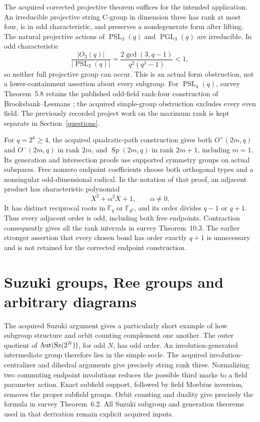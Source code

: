 \documentclass[11pt]{article}
\newcommand{\PSL}{\operatorname{PSL}}\newcommand{\PGL}{\operatorname{PGL}}
\newcommand{\Sp}{\operatorname{Sp}}\newcommand{\Aut}{\operatorname{Aut}}
\begin{document}
The acquired corrected projective theorem suffices for the intended
application. An irreducible projective string C-group in dimension
three has rank at most four, is in odd characteristic, and preserves
a nondegenerate form after lifting. The natural projective actions
of $\PSL_3(q)$ and $\PGL_3(q)$ are irreducible. In odd characteristic
\[
       \frac{|O_3(q)|}{|\PSL_3(q)|}
       =\frac{2\gcd(3,q-1)}{q^2(q^3-1)}<1,
\]
so neither full projective group can occur. This is an actual form
obstruction, not a lower-containment assertion about every subgroup.
For $\PSL_4(q)$, survey Theorem~5.8 retains the published odd-field
rank-four construction of Brooksbank--Leemans \cite{linear4}; the
acquired simple-group obstruction excludes every even field.
The previously recorded project work on the maximum rank is kept
separate in Section~\ref{questions}.

For $q=2^k\ge4$, the acquired quadratic-path construction gives both
$O^+(2m,q)$ and $O^-(2m,q)$ in rank $2m$, and $\Sp(2m,q)$ in
rank $2m+1$, including $m=1$. Its generation and intersection proofs
use supported symmetry groups on actual subspaces. Free nonzero
endpoint coefficients choose both orthogonal types and a nonsingular
odd-dimensional radical. In the notation of that proof, an adjacent
product has characteristic polynomial
\[
                         X^2+\alpha^2X+1,\qquad\alpha\ne0.
\]
It has distinct reciprocal roots in $\mathbb F_q$ or
$\mathbb F_{q^2}$, and its order divides $q-1$ or $q+1$.
Thus every adjacent order is odd, including both free endpoints.
Contraction consequently gives all the rank intervals in survey
Theorem~10.3. The earlier stronger assertion that every chosen bond
has order exactly $q+1$ is unnecessary and is not retained for the
corrected endpoint construction.

\section{Suzuki groups, Ree groups and arbitrary diagrams}
The acquired Suzuki argument gives a particularly short example of
how subgroup structure and orbit counting complement one another.
The outer quotient of $\Aut(\Sz(2^N))$, for odd $N$, has odd order.
An involution-generated intermediate group therefore lies in the
simple socle. The acquired involution-centralizer and dihedral
arguments give precisely string rank three. Normalizing two commuting
endpoint involutions reduces the possible third marks to a field
parameter action. Exact subfield support, followed by field
Moebius inversion, removes the proper subfield groups. Orbit counting
and duality give precisely the formula in survey Theorem~6.2.
All Suzuki subgroup and generation theorems used in that derivation
remain explicit acquired inputs.
\end{document}
